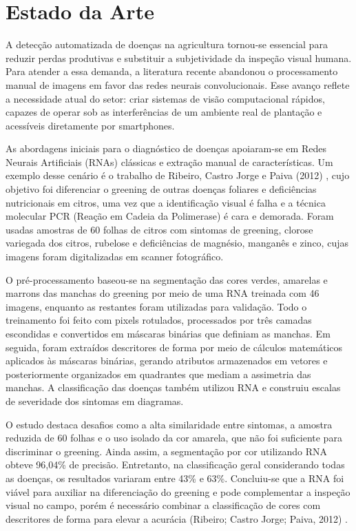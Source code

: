 \documentclass[11pt,a4paper]{article}
\begin{document}
\section{Estado da Arte}

A detecção automatizada de doenças na agricultura tornou-se essencial para reduzir perdas produtivas e substituir a subjetividade da inspeção visual humana. Para atender a essa demanda, a literatura recente abandonou o processamento manual de imagens em favor das redes neurais convolucionais. Esse avanço reflete a necessidade atual do setor: criar sistemas de visão computacional rápidos, capazes de operar sob as interferências de um ambiente real de plantação e acessíveis diretamente por smartphones.

As abordagens iniciais para o diagnóstico de doenças apoiaram-se em Redes Neurais Artificiais (RNAs) clássicas e extração manual de características. Um exemplo desse cenário é o trabalho de Ribeiro, Castro Jorge e Paiva (2012) \cite{Ribeiro2012}, cujo objetivo foi diferenciar o greening de outras doenças foliares e deficiências nutricionais em citros, uma vez que a identificação visual é falha e a técnica molecular PCR (Reação em Cadeia da Polimerase) é cara e demorada. Foram usadas amostras de 60 folhas de citros com sintomas de greening, clorose variegada dos citros, rubelose e deficiências de magnésio, manganês e zinco, cujas imagens foram digitalizadas em scanner fotográfico.

O pré-processamento baseou-se na segmentação das cores verdes, amarelas e marrons das manchas do greening por meio de uma RNA treinada com 46 imagens, enquanto as restantes foram utilizadas para validação. Todo o treinamento foi feito com pixels rotulados, processados por três camadas escondidas e convertidos em máscaras binárias que definiam as manchas. Em seguida, foram extraídos descritores de forma por meio de cálculos matemáticos aplicados às máscaras binárias, gerando atributos armazenados em vetores e posteriormente organizados em quadrantes que mediam a assimetria das manchas. A classificação das doenças também utilizou RNA e construiu escalas de severidade dos sintomas em diagramas.

O estudo destaca desafios como a alta similaridade entre sintomas, a amostra reduzida de 60 folhas e o uso isolado da cor amarela, que não foi suficiente para discriminar o greening. Ainda assim, a segmentação por cor utilizando RNA obteve 96,04\% de precisão. Entretanto, na classificação geral considerando todas as doenças, os resultados variaram entre 43\% e 63\%. Concluiu-se que a RNA foi viável para auxiliar na diferenciação do greening e pode complementar a inspeção visual no campo, porém é necessário combinar a classificação de cores com descritores de forma para elevar a acurácia (Ribeiro; Castro Jorge; Paiva, 2012) \cite{Ribeiro2012}.
\end{document}

